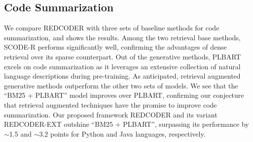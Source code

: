 \documentclass[11pt]{article}
\newcommand{\notesc}[1]{\textcolor{purple}{\bf\small [#1 --Saikat]}}
\newcommand{\tool}{{REDCODER}\xspace}
\newcommand{\toolext}{{REDCODER-EXT}\xspace}
\newcommand{\coder}{SCODE-R\xspace}
\begin{document}
     
    \begin{comment}For an example, a summary asks to write a Java code of getting a MuxerStream given a postion. 
    \notesc{What is the point of describing things that are not in the main paper? The paper is supposed to be self-containing.} In 
Appendix,
    we show corresponding retrieved code, their summaries, PLBART's and our generations. As can be seen, PLBART generates a basic but relevant code, both retrieved code (rank-1 and rank-3 showed) contains the statements with variable ``cPtr'' one of them is of Muxer class and another is from DeMuxer class. \tool generates a somewhat correct code of MuxerStream class  and it takes the position argument too. Seemingly, while fusing the retrieved code as the input summary does not match rank-3 retrieved code's name, it only take the line with ``cPtr'' from that retrieved code  and the function definition from the rank-1 code. Now when we are allowed to leverage the summaries of the retrieved code, \toolext can match the summary of the rank-3 retrieved code with the input and that's why it produces the Muxer class object but with the ``throw exceptions'' from the rank-3 retrieved code. Similarly the results on Concode benchmark are in Table \ref{table:concode}. \tool achieves the state-of-the-art EM and CodeBLEU results and \toolext achieves the best BLEU score. 
    \end{comment}

    \subsection{Code Summarization}
    \label{sec:exp-result-codesum}
    
    We compare \tool with three sets of baseline methods for code summarization, and  shows the results.  
    Among the two retrieval base methods, \coder performs significantly well, confirming the advantages of dense retrieval over its sparse counterpart.
    Out of the generative methods, PLBART excels on code summarization as it leverages an extensive collection of natural language descriptions during pre-training.
    As anticipated, retrieval augmented generative methods outperform the other two sets of models.
    We see that the ``BM25 + PLBART'' model improves over PLBART, confirming our conjecture that retrieval augmented techniques have the promise to improve code summarization.
    Our proposed framework \tool and its variant \toolext outshine ``BM25 + PLBART'', surpassing its performance by $\sim$1.5 and $\sim$3.2 points for Python and Java languages, respectively.
\end{document}
